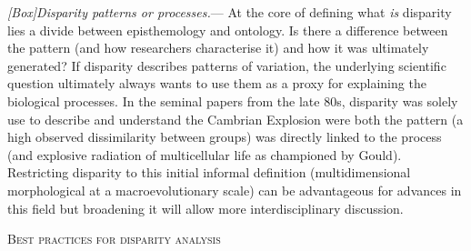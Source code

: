 \documentclass[12pt,letterpaper]{article}
\renewcommand{\section}[1]{%
\bigskip
\begin{center}
\begin{Large}
\normalfont\scshape #1
\medskip
\end{Large}
\end{center}}
\renewcommand{\subsubsection}[1]{%
\vspace{2ex}
\noindent
\textit{#1.}---}
\begin{document}
\subsubsection{[Box]Disparity patterns or processes}
At the core of defining what \textit{is} disparity lies a divide between episthemology and ontology.
Is there a difference between the pattern (and how researchers characterise it) and how it was ultimately generated?
If disparity describes patterns of variation, the underlying scientific question ultimately always wants to use them as a proxy for explaining the biological processes.
In the seminal papers from the late 80s, disparity was solely use to describe and understand the Cambrian Explosion were both the pattern (a high observed dissimilarity between groups) was directly linked to the process (and explosive radiation of multicellular life as championed by Gould).
Restricting disparity to this initial informal definition (multidimensional morphological at a macroevolutionary scale) can be advantageous for advances in this field but broadening it will allow more interdisciplinary discussion.



\section{Best practices for disparity analysis}
\end{document}

